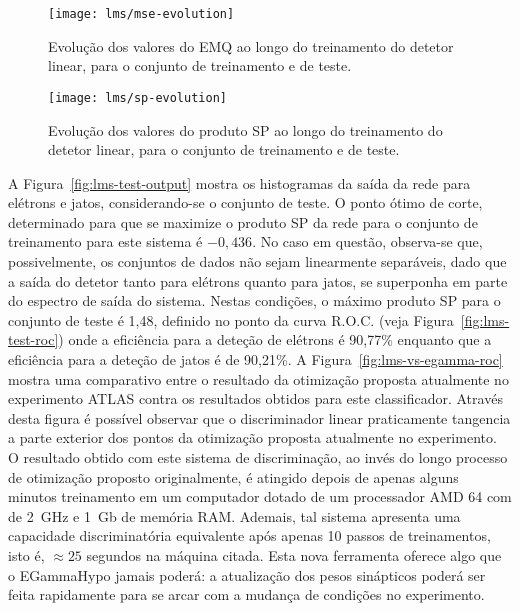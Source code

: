 \begin{figure}
\begin{center}
\texttt{[image: lms/mse-evolution]}
\end{center}
\caption{Evolução dos valores do EMQ ao longo do treinamento do detetor
linear, para o conjunto de treinamento e de teste.}
\label{fig:lms-mse-evo}
\end{figure}

\begin{figure}
\begin{center}
\texttt{[image: lms/sp-evolution]}
\end{center}
\caption{Evolução dos valores do produto SP ao longo do treinamento do detetor
linear, para o conjunto de treinamento e de teste.}
\label{fig:lms-sp-evo}
\end{figure}

A Figura~\ref{fig:lms-test-output} mostra os histogramas da saída da rede para
elétrons e jatos, considerando-se o conjunto de teste. O ponto ótimo de corte,
determinado para que se maximize o produto SP da rede para o conjunto de
treinamento para este sistema é $-0,436$. No caso em questão, observa-se que,
possivelmente, os conjuntos de dados não sejam linearmente separáveis, dado
que a saída do detetor tanto para elétrons quanto para jatos, se superponha em
parte do espectro de saída do sistema. Nestas condições, o máximo produto SP
para o conjunto de teste é 1,48, definido no ponto da curva R.O.C. (veja
Figura~\ref{fig:lms-test-roc}) onde a eficiência para a deteção de elétrons é
90,77\% enquanto que a eficiência para a deteção de jatos é de 90,21\%. A
Figura~\ref{fig:lms-vs-egamma-roc} mostra uma comparativo entre o resultado da
otimização proposta atualmente no experimento ATLAS contra os resultados
obtidos para este classificador. Através desta figura é possível observar que
o discriminador linear praticamente tangencia a parte exterior dos pontos da
otimização proposta atualmente no experimento. O resultado obtido com este
sistema de discriminação, ao invés do longo processo de otimização proposto
originalmente, é atingido depois de apenas alguns minutos treinamento em um
computador dotado de um processador AMD 64 com  de 2~GHz e 1~Gb de
memória RAM. Ademais, tal sistema apresenta uma capacidade discriminatória
equivalente após apenas 10 passos de treinamentos, isto é, $\approx 25$
segundos na máquina citada. Esta nova ferramenta oferece algo que o EGammaHypo
jamais poderá: a atualização dos pesos sinápticos poderá ser feita rapidamente
para se arcar com a mudança de condições no experimento.

